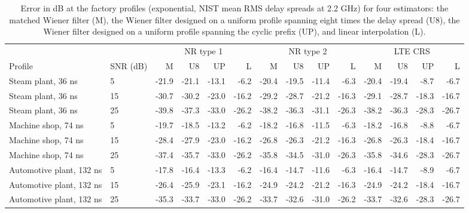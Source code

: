\begin{table}[t]
\centering
\caption{Error in dB at the factory profiles (exponential, NIST mean RMS delay spreads at 2.2 GHz) for four estimators: the matched Wiener filter (M), the Wiener filter designed on a uniform profile spanning eight times the delay spread (U8), the Wiener filter designed on a uniform profile spanning the cyclic prefix (UP), and linear interpolation (L).}
\label{tab:sites}
\footnotesize
\setlength{\tabcolsep}{3pt}
\begin{tabular}{ll rrrr rrrr rrrr}
\toprule
 & & \multicolumn{4}{c}{NR type 1} & \multicolumn{4}{c}{NR type 2} & \multicolumn{4}{c}{LTE CRS} \\
\cmidrule(lr){3-6}\cmidrule(lr){7-10}\cmidrule(lr){11-14}
Profile & SNR (dB) & M & U8 & UP & L & M & U8 & UP & L & M & U8 & UP & L \\
\midrule
Steam plant, 36 ns & 5 & -21.9 & -21.1 & -13.1 & -6.2 & -20.4 & -19.5 & -11.4 & -6.3 & -20.4 & -19.4 & -8.7 & -6.7 \\
Steam plant, 36 ns & 15 & -30.7 & -30.2 & -23.0 & -16.2 & -29.2 & -28.7 & -21.2 & -16.3 & -29.1 & -28.7 & -18.3 & -16.7 \\
Steam plant, 36 ns & 25 & -39.8 & -37.3 & -33.0 & -26.2 & -38.2 & -36.3 & -31.1 & -26.3 & -38.2 & -36.3 & -28.3 & -26.7 \\
Machine shop, 74 ns & 5 & -19.7 & -18.5 & -13.2 & -6.2 & -18.2 & -16.8 & -11.5 & -6.3 & -18.2 & -16.8 & -8.8 & -6.7 \\
Machine shop, 74 ns & 15 & -28.4 & -27.9 & -23.0 & -16.2 & -26.8 & -26.3 & -21.2 & -16.3 & -26.8 & -26.3 & -18.4 & -16.7 \\
Machine shop, 74 ns & 25 & -37.4 & -35.7 & -33.0 & -26.2 & -35.8 & -34.5 & -31.0 & -26.3 & -35.8 & -34.6 & -28.3 & -26.7 \\
Automotive plant, 132 ns & 5 & -17.8 & -16.4 & -13.3 & -6.2 & -16.4 & -14.7 & -11.6 & -6.3 & -16.4 & -14.7 & -8.9 & -6.7 \\
Automotive plant, 132 ns & 15 & -26.4 & -25.9 & -23.1 & -16.2 & -24.9 & -24.2 & -21.2 & -16.3 & -24.9 & -24.2 & -18.4 & -16.7 \\
Automotive plant, 132 ns & 25 & -35.3 & -33.7 & -33.0 & -26.2 & -33.7 & -32.6 & -31.0 & -26.2 & -33.7 & -32.6 & -28.3 & -26.7 \\
\bottomrule
\end{tabular}
\end{table}
